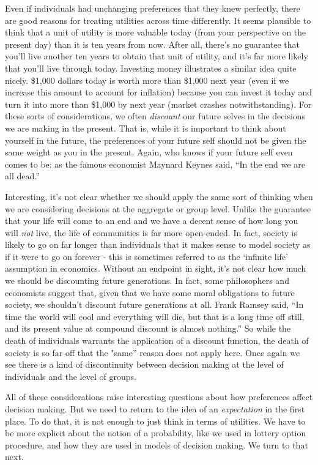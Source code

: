 \documentclass[]{tufte-book}
\begin{document}
Even if individuals had unchanging preferences that they knew perfectly, there are good reasons for treating utilities across time differently. It seems plausible to think that a unit of utility is more valuable today (from your perspective on the present day) than it is ten years from now. After all, there's no guarantee that you'll live another ten years to obtain that unit of utility, and it's far more likely that you'll live through today. Investing money illustrates a similar idea quite nicely. \$1,000 dollars today is worth more than \$1,000 next year (even if we increase this amount to account for inflation) because you can invest it today and turn it into more than \$1,000 by next year (market crashes notwithstanding). For these sorts of considerations, we often \emph{discount} our future selves in the decisions we are making in the present. That is, while it is important to think about yourself in the future, the preferences of your future self should not be given the same weight as you in the present. Again, who knows if your future self even comes to be: as the famous economist Maynard Keynes said, ``In the end we are all dead.''

Interesting, it's not clear whether we should apply the same sort of thinking when we are considering decisions at the aggregate or group level. Unlike the guarantee that your life will come to an end and we have a decent sense of how long you will \emph{not} live, the life of communities is far more open-ended. In fact, society is likely to go on far longer than individuals that it makes sense to model society as if it were to go on forever - this is sometimes referred to as the `infinite life' assumption in economics. Without an endpoint in sight, it's not clear how much we should be discounting future generations. In fact, some philosophers and economists suggest that, given that we have some moral obligations to future society, we shouldn't discount future generations at all. Frank Ramsey said, ``In time the world will cool and everything will die, but that is a long time off still, and its present value at compound discount is almost nothing.'' So while the death of individuals warrants the application of a discount function, the death of society is so far off that the "same'' reason does not apply here. Once again we see there is a kind of discontinuity between decision making at the level of individuals and the level of groups.

All of these considerations raise interesting questions about how preferences affect decision making. But we need to return to the idea of an \emph{expectation} in the first place. To do that, it is not enough to just think in terms of utilities. We have to be more explicit about the notion of a probability, like we used in lottery option procedure, and how they are used in models of decision making. We turn to that next.
\end{document}
